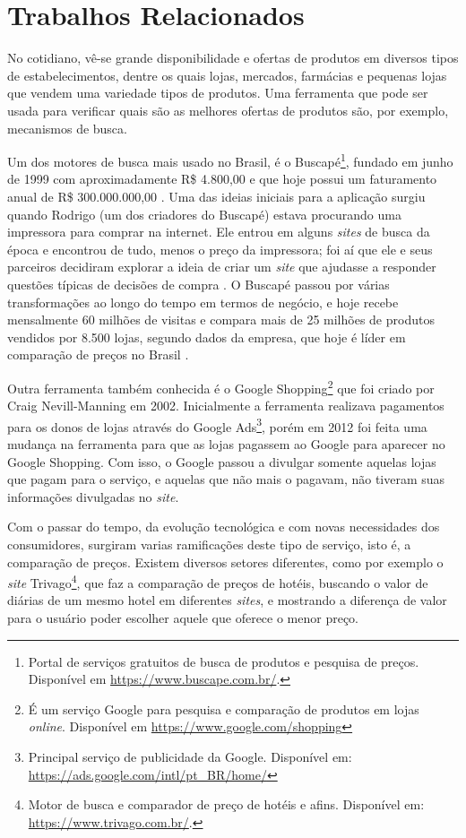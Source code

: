 \section{Trabalhos Relacionados}
\label{sec:trabalhos-relacionados}

No cotidiano, vê-se grande disponibilidade e ofertas de produtos em diversos tipos de estabelecimentos, dentre os quais lojas, mercados, farmácias e pequenas lojas que vendem uma variedade tipos de produtos. Uma ferramenta que pode ser usada para verificar quais são as melhores ofertas de produtos são, por exemplo, mecanismos de busca.

Um dos motores de busca mais usado no Brasil, é o Buscapé\footnote{Portal de serviços gratuitos de busca de produtos e pesquisa de preços. Disponível em \url{https://www.buscape.com.br/}.}, fundado em junho de 1999 com aproximadamente R\$ 4.800,00 e que hoje possui um faturamento anual de R\$ 300.000.000,00 \cite{EmídiaFelipe2017BUSCAPÉ}. Uma das ideias iniciais para a aplicação surgiu quando Rodrigo (um dos criadores do Buscapé) estava procurando uma impressora para comprar na internet. Ele entrou em alguns \textit{sites} de busca da época e encontrou de tudo, menos o preço da impressora; foi aí que ele e seus parceiros decidiram explorar a ideia de criar um \textit{site} que ajudasse a responder questões típicas de decisões de compra \cite{Arruda2011Buscapé}. O Buscapé passou por várias transformações ao longo do tempo em termos de negócio, e hoje recebe mensalmente 60 milhões de visitas e compara mais de 25 milhões de produtos vendidos por 8.500 lojas, segundo dados da empresa, que hoje é líder em comparação de preços no Brasil \cite{Heloísa2017Startups}.

Outra ferramenta também conhecida é o Google Shopping\footnote{É um serviço Google para pesquisa e comparação de produtos em lojas \textit{online}. Disponível em \url{https://www.google.com/shopping}} que foi criado por Craig Nevill-Manning em 2002. Inicialmente a ferramenta realizava pagamentos para os donos de lojas através do Google Ads\footnote{Principal serviço de publicidade da Google. Disponível em: \url{https://ads.google.com/intl/pt_BR/home/}}, porém em 2012 foi feita uma mudança na ferramenta para que as lojas pagassem ao Google para aparecer no Google Shopping. Com isso, o Google passou a divulgar somente aquelas lojas que pagam para o serviço, e aquelas que não mais o pagavam, não tiveram suas informações divulgadas no \textit{site}.

Com o passar do tempo, da evolução tecnológica e com novas necessidades dos consumidores, surgiram varias ramificações deste tipo de serviço, isto é, a comparação de preços. Existem diversos setores diferentes, como por exemplo o \textit{site} Trivago\footnote{Motor de busca e comparador de preço de hotéis e afins. Disponível em: \url{https://www.trivago.com.br/}.}, que faz a comparação de preços de hotéis, buscando o valor de diárias de um mesmo hotel em diferentes \textit{sites}, e mostrando a diferença de valor para o usuário poder escolher aquele que oferece o menor preço.

